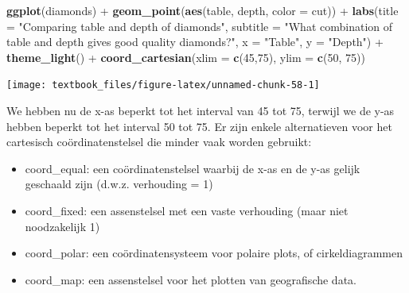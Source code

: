 \documentclass[]{tufte-book}
\newenvironment{Shaded}{}{}
\newcommand{\DataTypeTok}[1]{\textcolor[rgb]{0.56,0.13,0.00}{#1}}
\newcommand{\DecValTok}[1]{\textcolor[rgb]{0.25,0.63,0.44}{#1}}
\newcommand{\KeywordTok}[1]{\textcolor[rgb]{0.00,0.44,0.13}{\textbf{#1}}}
\newcommand{\NormalTok}[1]{#1}
\newcommand{\OperatorTok}[1]{\textcolor[rgb]{0.40,0.40,0.40}{#1}}
\newcommand{\StringTok}[1]{\textcolor[rgb]{0.25,0.44,0.63}{#1}}
\providecommand{\tightlist}{%
  \setlength{\itemsep}{0pt}\setlength{\parskip}{0pt}}
\begin{document}
\begin{Shaded}
\begin{Highlighting}[]
\KeywordTok{ggplot}\NormalTok{(diamonds) }\OperatorTok{+}
\StringTok{    }\KeywordTok{geom_point}\NormalTok{(}\KeywordTok{aes}\NormalTok{(table, depth, }\DataTypeTok{color =}\NormalTok{ cut)) }\OperatorTok{+}\StringTok{ }
\StringTok{    }\KeywordTok{labs}\NormalTok{(}\DataTypeTok{title =} \StringTok{"Comparing table and depth of diamonds"}\NormalTok{,}
         \DataTypeTok{subtitle =} \StringTok{"What combination of table and depth gives good quality diamonds?"}\NormalTok{,}
         \DataTypeTok{x =} \StringTok{"Table"}\NormalTok{,}
         \DataTypeTok{y =} \StringTok{"Depth"}\NormalTok{) }\OperatorTok{+}
\StringTok{    }\KeywordTok{theme_light}\NormalTok{() }\OperatorTok{+}
\StringTok{    }\KeywordTok{coord_cartesian}\NormalTok{(}\DataTypeTok{xlim =} \KeywordTok{c}\NormalTok{(}\DecValTok{45}\NormalTok{,}\DecValTok{75}\NormalTok{), }\DataTypeTok{ylim =} \KeywordTok{c}\NormalTok{(}\DecValTok{50}\NormalTok{, }\DecValTok{75}\NormalTok{))}
\end{Highlighting}
\end{Shaded}

\texttt{[image: textbook\_files/figure-latex/unnamed-chunk-58-1]}

We hebben nu de x-as beperkt tot het interval van 45 tot 75, terwijl we de y-as hebben beperkt tot het interval 50 tot 75. Er zijn enkele alternatieven voor het cartesisch coördinatenstelsel die minder vaak worden gebruikt:

\begin{itemize}
\tightlist
\item
  coord\_equal: een coördinatenstelsel waarbij de x-as en de y-as gelijk geschaald zijn (d.w.z. verhouding = 1)
\item
  coord\_fixed: een assenstelsel met een vaste verhouding (maar niet noodzakelijk 1)
\item
  coord\_polar: een coördinatensysteem voor polaire plots, of cirkeldiagrammen
\item
  coord\_map: een assenstelsel voor het plotten van geografische data.
\end{itemize}
\end{document}
